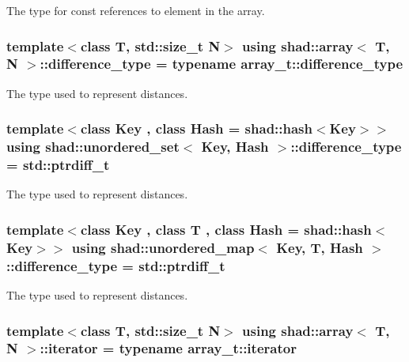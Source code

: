 The type for const references to element in the array. 

\hypertarget{group__Types_ga588f85dc2eccfd3b3a1a6229d4cfd04a}{
\subsubsection[{difference\-\_\-type}]{\setlength{\rightskip}{0pt plus 5cm}template$<$class T, std\-::size\-\_\-t N$>$ using {\bf shad\-::array}$<$ T, N $>$\-::difference\-\_\-type =  typename array\-\_\-t\-::difference\-\_\-type}}\label{group__Types_ga588f85dc2eccfd3b3a1a6229d4cfd04a}


The type used to represent distances. 

\hypertarget{group__Types_gaa58125290d23043a3bdfa2430291a1e8}{
\subsubsection[{difference\-\_\-type}]{\setlength{\rightskip}{0pt plus 5cm}template$<$class Key , class Hash  = shad\-::hash$<$\-Key$>$$>$ using {\bf shad\-::unordered\-\_\-set}$<$ Key, Hash $>$\-::difference\-\_\-type =  std\-::ptrdiff\-\_\-t}}\label{group__Types_gaa58125290d23043a3bdfa2430291a1e8}


The type used to represent distances. 

\hypertarget{group__Types_ga2a1294efcd043aa4bbb5da7c3c811448}{
\subsubsection[{difference\-\_\-type}]{\setlength{\rightskip}{0pt plus 5cm}template$<$class Key , class T , class Hash  = shad\-::hash$<$\-Key$>$$>$ using {\bf shad\-::unordered\-\_\-map}$<$ Key, T, Hash $>$\-::difference\-\_\-type =  std\-::ptrdiff\-\_\-t}}\label{group__Types_ga2a1294efcd043aa4bbb5da7c3c811448}


The type used to represent distances. 

\hypertarget{group__Types_ga7b1db0deafc45673f50da5aacb8c372c}{
\subsubsection[{iterator}]{\setlength{\rightskip}{0pt plus 5cm}template$<$class T, std\-::size\-\_\-t N$>$ using {\bf shad\-::array}$<$ T, N $>$\-::iterator =  typename array\-\_\-t\-::iterator}}\label{group__Types_ga7b1db0deafc45673f50da5aacb8c372c}


